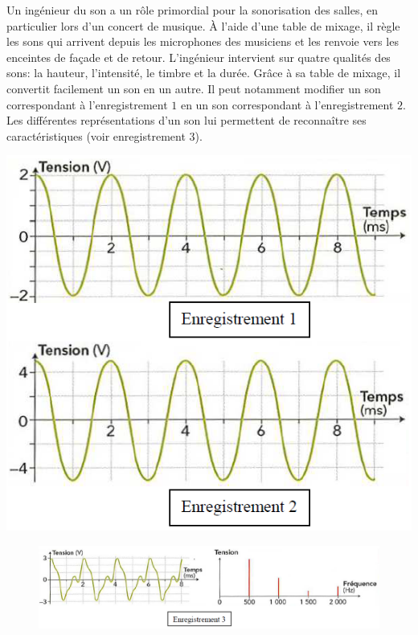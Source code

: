 \begin{enumerate}
\begin{minipage}[c]{.46\linewidth}
Un ingénieur du son a un rôle primordial
pour la sonorisation des salles, en
particulier lors d'un concert de musique. À
l'aide d'une table de mixage, il règle les
sons qui arrivent depuis les microphones
des musiciens et les renvoie vers les
enceintes de façade et de retour.
L'ingénieur intervient sur quatre qualités
des sons: la hauteur, l'intensité, le timbre
et la durée. Grâce à sa table de mixage, il
convertit facilement un son en un autre. Il
peut notamment modifier un son
correspondant à l'enregistrement $1$ en un
son correspondant à l'enregistrement $2$.
Les différentes représentations d'un son lui
permettent de reconnaître ses caractéristiques (voir enregistrement $3$).
\end{minipage}
\begin{minipage}[c]{.46\linewidth}
\begin{center}
\includegraphics[width=\columnwidth]{images/Exo3_Ondes_Enregistrement_Oscillo}
\end{center}
\end{minipage}

\vspace{0.3cm}

\begin{figure}[!htbp]
\begin{center}
\includegraphics[width=\columnwidth]{images/Exo3_Ondes_Enregistrement_Oscillo3}
\end{center}
\end{figure}


\end{enumerate}
